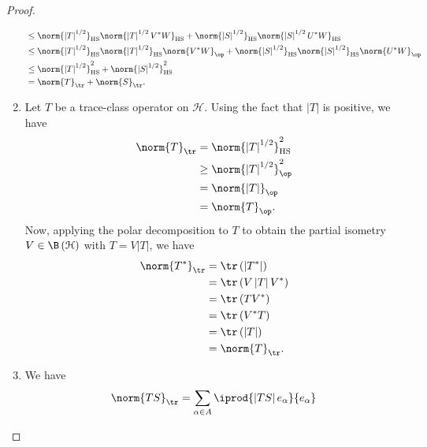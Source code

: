 \documentclass[10pt]{mypackage}
\DeclareMathOperator{\hs}{HS}
\begin{document}
\begin{proof}
\begin{enumerate}[(1)]
\begin{align*}
                           &\leq \norm{\left\vert T \right\vert^{1/2}}_{\hs}\norm{\left\vert T \right\vert^{1/2}V^{\ast}W}_{\hs} + \norm{\left\vert S \right\vert^{1/2}}_{\hs}\norm{\left\vert S \right\vert^{1/2}U^{\ast}W}_{\hs}\\
                           &\leq \norm{\left\vert T \right\vert^{1/2}}_{\hs}\norm{\left\vert T \right\vert^{1/2}}_{\hs}\norm{V^{\ast}W}_{\op} + \norm{\left\vert S \right\vert^{1/2}}_{\hs}\norm{\left\vert S \right\vert^{1/2}}_{\hs}\norm{U^{\ast}W}_{\op}\\
                           &\leq \norm{\left\vert T \right\vert^{1/2}}_{\hs}^2 + \norm{\left\vert S \right\vert^{1/2}}_{\hs}^2\\
                           &= \norm{T}_{\tr} + \norm{S}_{\tr}.
      \end{align*}
    \item Let $T$ be a trace-class operator on $\mathcal{H}$. Using the fact that $\left\vert T \right\vert$ is positive, we have
      \begin{align*}
        \norm{T}_{\tr} &= \norm{\left\vert T \right\vert^{1/2}}_{\hs}^2\\
                       &\geq \norm{\left\vert T \right\vert^{1/2}}_{\op}^2\\
                       &= \norm{\left\vert T \right\vert}_{\op}\\
                       &= \norm{T}_{\op}.
      \end{align*}
      Now, applying the polar decomposition to $T$ to obtain the partial isometry $V\in \B\left( \mathcal{H} \right)$ with $T = V\left\vert T \right\vert$, we have
      \begin{align*}
        \norm{T^{\ast}}_{\tr} &= \tr\left( \left\vert T^{\ast} \right\vert \right)\\
                              &= \tr\left( V\left\vert T \right\vert V^{\ast} \right)\\
                              &= \tr\left( TV^{\ast} \right)\\
                              &= \tr\left( V^{\ast}T \right)\\
                              &= \tr\left( \left\vert T \right\vert \right)\\
                              &= \norm{T}_{\tr}.
      \end{align*}
    \item We have
      \begin{align*}
        \norm{TS}_{\tr} &= \sum_{\alpha\in A} \iprod{\left\vert TS \right\vert e_{\alpha}}{e_{\alpha}}\\

\end{align*}
\end{enumerate}
\end{proof}
\end{document}
